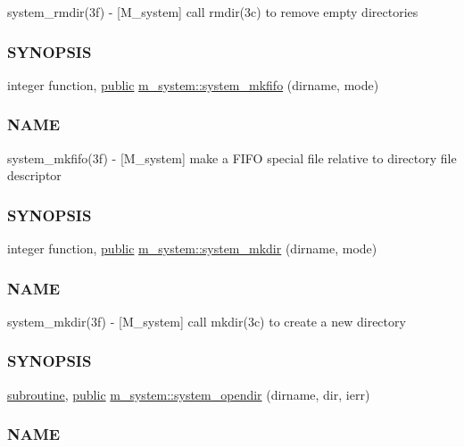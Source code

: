 \begin{DoxyCompactItemize}
\begin{DoxyCompactList}
system\+\_\+rmdir(3f) -\/ \mbox{[}M\+\_\+system\mbox{]} call rmdir(3c) to remove empty directories \subsubsection*{S\+Y\+N\+O\+P\+S\+IS}\end{DoxyCompactList}\item 
integer function, \hyperlink{M__stopwatch_83_8txt_a2f74811300c361e53b430611a7d1769f}{public} \hyperlink{namespacem__system_aaa02751b5065c8fd046a56cbbd1a0e1e}{m\+\_\+system\+::system\+\_\+mkfifo} (dirname, mode)
\begin{DoxyCompactList}\small\item\em \subsubsection*{N\+A\+ME}

system\+\_\+mkfifo(3f) -\/ \mbox{[}M\+\_\+system\mbox{]} make a F\+I\+FO special file relative to directory file descriptor \subsubsection*{S\+Y\+N\+O\+P\+S\+IS}\end{DoxyCompactList}\item 
integer function, \hyperlink{M__stopwatch_83_8txt_a2f74811300c361e53b430611a7d1769f}{public} \hyperlink{namespacem__system_a084d644c236d22af2cc75c6e48fd6e96}{m\+\_\+system\+::system\+\_\+mkdir} (dirname, mode)
\begin{DoxyCompactList}\small\item\em \subsubsection*{N\+A\+ME}

system\+\_\+mkdir(3f) -\/ \mbox{[}M\+\_\+system\mbox{]} call mkdir(3c) to create a new directory \subsubsection*{S\+Y\+N\+O\+P\+S\+IS}\end{DoxyCompactList}\item 
\hyperlink{M__stopwatch_83_8txt_acfbcff50169d691ff02d4a123ed70482}{subroutine}, \hyperlink{M__stopwatch_83_8txt_a2f74811300c361e53b430611a7d1769f}{public} \hyperlink{namespacem__system_a622cc67c03e8cdea1d4c2430bb36081b}{m\+\_\+system\+::system\+\_\+opendir} (dirname, dir, ierr)
\begin{DoxyCompactList}\small\item\em \subsubsection*{N\+A\+ME}


\end{DoxyCompactList}
\end{DoxyCompactItemize}
